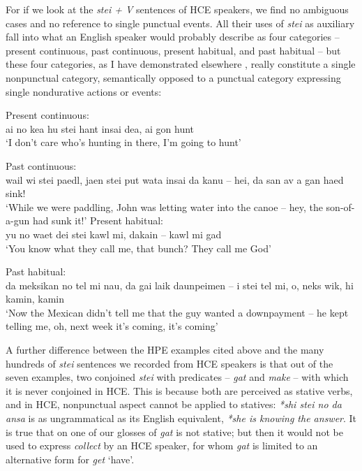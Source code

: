 For if we look at the \textit{stei + V} sentences of HCE speakers, we find no ambiguous cases and no reference to single punctual events. All their uses of \textit{stei} as auxiliary fall into what an English speaker would probably describe as four categories -- present continuous, past con\-tinuous, present habitual, and past habitual -- but these four categories, as I have demonstrated elsewhere \citep[Chapter 2]{Bickerton1975}, really constitute a single nonpunctual category, semantically opposed to a punctual category expressing single nondurative actions or events:

\ea\label{ex:52}
{Present continuous:}{}\\
ai no kea hu stei hant insai dea, ai gon hunt \\
\glt `I don't care who's hunting in there, I'm going to hunt'
\z

\ea\label{ex:53}
{Past continuous:}{}\\
wail wi stei paedl, jaen stei put wata insai da kanu -- hei, da san av a gan haed sink!\\
\glt `While we were paddling, John was letting water into the canoe -- hey, the son-of-a-gun had sunk it!'
\z
\ea\label{ex:54}
{Present habitual:}{} \\
 yu no waet dei stei kawl mi, dakain -- kawl mi gad\\
\glt `You know what they call me, that bunch? They call me God'
\z

\newpage
\ea\label{ex:55}
{Past habitual:}{}\\
da meksikan no tel mi nau, da gai laik daunpeimen -- i stei tel mi, o, neks wik, hi kamin, kamin\\
\glt `Now the Mexican didn't tell me that the guy wanted a down\-payment -- he kept telling me, oh, next week it's coming, it's coming'
\z

A further difference between the HPE examples cited above and the many hundreds of \textit{stei} sentences we recorded from HCE speakers is that out of the seven examples, two conjoined \textit{stei} with predicates -- \textit{gat} and \textit{make} -- with which it is never conjoined in HCE. This is because both are perceived as stative verbs, and in HCE, nonpunctual aspect cannot be applied to statives: \textit{*shi stei no da ansa} is as ungrammatical as its English equivalent, \textit{*she is knowing the answer}. It is true that on one of our glosses of  \textit{gat} is not stative; but then it would not be used to express \textit{collect} by an HCE speaker, for whom \textit{gat} is limited to an alternative form for \textit{get} `have'.

